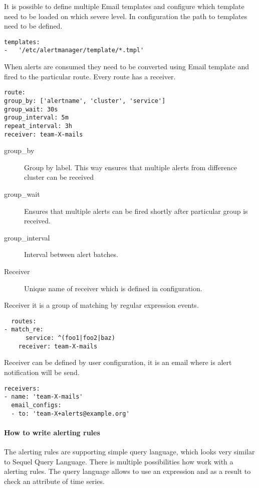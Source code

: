 It is possible to define multiple Email templates and configure which template need to be loaded on which severe level. In configuration the path to templates need to be defined. 

 \begin{lstlisting}
templates: 
-	'/etc/alertmanager/template/*.tmpl'
\end{lstlisting}

When alerts are consumed they need to be converted using Email template and fired to the particular route. Every route has a receiver. 

 \begin{lstlisting}
route:
group_by: ['alertname', 'cluster', 'service']
group_wait: 30s
group_interval: 5m
repeat_interval: 3h 
receiver: team-X-mails
\end{lstlisting}

\begin{description}
\item[group\_by] Group by label. This way ensures that multiple alerts from difference cluster can be received
\item[group\_wait] Ensures that multiple alerts can be fired shortly after particular group is received.
\item[group\_interval] Interval between alert batches.
\item[Receiver] Unique name of receiver which is defined in configuration. 
\end{description}

Receiver it is a group of matching by regular expression events.

 \begin{lstlisting}
  routes:
- match_re:
      service: ^(foo1|foo2|baz)
    receiver: team-X-mails
\end{lstlisting}

Receiver can be defined by user configuration, it is an email where is alert notification will be send.

 \begin{lstlisting}
receivers:
- name: 'team-X-mails'
  email_configs:
  - to: 'team-X+alerts@example.org'
\end{lstlisting}

\paragraph{How to write alerting rules} 

The alerting rules are supporting simple query language, which looks very similar to Sequel Query Language.  
There is multiple possibilities how work with a alerting rules. The query language allows to use an expression and as a result to check an attribute of time series. 

